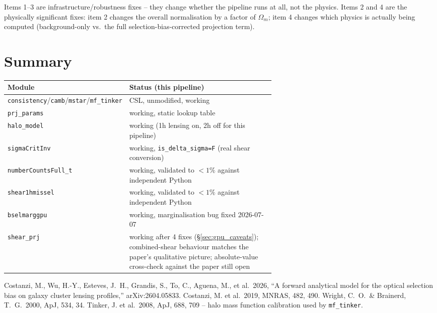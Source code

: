 \documentclass[a4paper, 11pt]{article}
\newcommand{\modname}[1]{\textcolor{kwcol}{\texttt{#1}}}
\begin{document}
Items 1--3 are infrastructure/robustness fixes -- they change whether the
pipeline runs at all, not the physics. Items 2 and 4 are the physically
significant fixes: item 2 changes the overall normalisation by a factor
of $\Omega_m$; item 4 changes which physics is actually being computed
(background-only vs.\ the full selection-bias-corrected projection term).

\section{Summary}

\begin{center}
\small
\begin{tabular}{@{}l p{0.62\linewidth}@{}}
\toprule
Module & Status (this pipeline) \\
\midrule
\modname{consistency}/\modname{camb}/\modname{mstar}/\modname{mf\_tinker} & CSL, unmodified, working \\
\modname{prj\_params}      & working, static lookup table \\
\modname{halo\_model}      & working (1h lensing on, 2h off for this pipeline) \\
\modname{sigmaCritInv}     & working, \texttt{is\_delta\_sigma=F} (real shear conversion) \\
\modname{numberCountsFull\_t} & working, validated to $<1\%$ against independent Python \\
\modname{shear1hmissel}    & working, validated to $<1\%$ against independent Python \\
\modname{bselmarggpu}      & working, marginalisation bug fixed 2026-07-07 \\
\modname{shear\_prj}       & working after 4 fixes (\S\ref{sec:gpu_caveats}); combined-shear
  behaviour matches the paper's qualitative picture; absolute-value
  cross-check against the paper still open \\
\bottomrule
\end{tabular}
\end{center}

\begin{thebibliography}{9}
 Costanzi, M., Wu, H.-Y., Esteves, J.~H., Grandis, S., To, C., Aguena, M., et al.\ 2026, ``A forward analytical model for the optical selection bias on galaxy cluster lensing profiles,'' arXiv:2604.05833.
 Costanzi, M. et al.\ 2019, MNRAS, 482, 490.
 Wright, C.~O.\ \& Brainerd, T.~G.\ 2000, ApJ, 534, 34.
 Tinker, J. et al.\ 2008, ApJ, 688, 709 -- halo mass function calibration used by \modname{mf\_tinker}.
\end{thebibliography}
\end{document}
